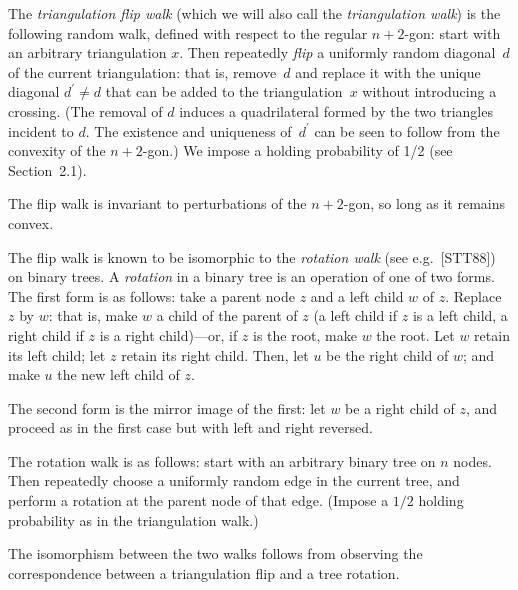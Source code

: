 The \emph{triangulation flip walk} (which we will also call the \emph{triangulation walk}) is the following random walk, defined with respect to the regular $n+2$-gon: start with an arbitrary triangulation $x$. Then repeatedly \emph{flip} a uniformly random diagonal $d$ of the current triangulation: that is, remove $d$ and replace it with the unique diagonal $d^{\prime}\neq d$ that can be added to the triangulation $x$ without introducing a crossing. (The removal of $d$ induces a quadrilateral formed by the two triangles incident to $d$. The existence and uniqueness of $d^{\prime}$ can be seen to follow from the convexity of the $n+2$-gon.) We impose a holding probability of 1/2 (see Section 2.1).\par




The flip walk is invariant to perturbations of the $n+2$-gon, so long as it remains convex.\par




The flip walk is known to be isomorphic to the \emph{rotation walk} (see e.g. [STT88]) on binary trees. A \emph{rotation} in a binary tree is an operation of one of two forms. The first form is as follows: take a parent node $z$ and a left child $w$ of $z$. Replace $z$ by $w$: that is, make $w$ a child of the parent of $z$ (a left child if $z$ is a left child, a right child if $z$ is a right child)—or, if $z$ is the root, make $w$ the root. Let $w$ retain its left child; let $z$ retain its right child. Then, let $u$ be the right child of $w$; and make $u$ the new left child of $z$.\par




The second form is the mirror image of the first: let $w$ be a right child of $z$, and proceed as in the first case but with left and right reversed.\par




The rotation walk is as follows: start with an arbitrary binary tree on $n$ nodes. Then repeatedly choose a uniformly random edge in the current tree, and perform a rotation at the parent node of that edge. (Impose a $1/2$ holding probability as in the triangulation walk.)\par




The isomorphism between the two walks follows from observing the correspondence between a triangulation flip and a tree rotation.\par





